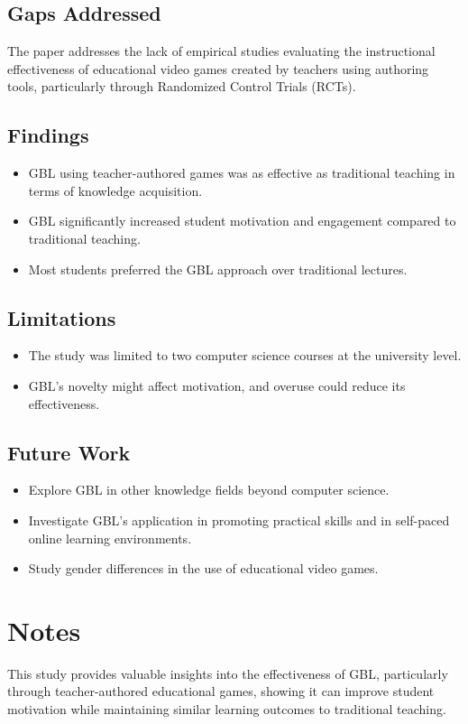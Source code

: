 \subsection{Gaps Addressed}
The paper addresses the lack of empirical studies evaluating the instructional effectiveness of educational video games created by teachers using authoring tools, particularly through Randomized Control Trials (RCTs).

\subsection{Findings}
\begin{itemize}
    \item GBL using teacher-authored games was as effective as traditional teaching in terms of knowledge acquisition.
    \item GBL significantly increased student motivation and engagement compared to traditional teaching.
    \item Most students preferred the GBL approach over traditional lectures.
\end{itemize}

\subsection{Limitations}
\begin{itemize}
    \item The study was limited to two computer science courses at the university level.
    \item GBL's novelty might affect motivation, and overuse could reduce its effectiveness.
\end{itemize}

\subsection{Future Work}
\begin{itemize}
    \item Explore GBL in other knowledge fields beyond computer science.
    \item Investigate GBL's application in promoting practical skills and in self-paced online learning environments.
    \item Study gender differences in the use of educational video games.
\end{itemize}

\section{Notes}
This study provides valuable insights into the effectiveness of GBL, particularly through teacher-authored educational games, showing it can improve student motivation while maintaining similar learning outcomes to traditional teaching.
